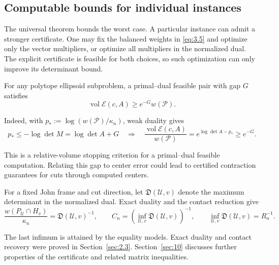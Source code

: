 \subsection{Computable bounds for individual instances}\label{sec:7.3}

The universal theorem bounds the worst case. A particular instance can admit a stronger certificate. One may fix the balanced weights in \eqref{eq:3.5} and optimize only the vector multipliers, or optimize all multipliers in the normalized dual. The explicit certificate is feasible for both choices, so such optimization can only improve its determinant bound.

For any polytope ellipsoid subproblem, a primal--dual feasible pair with gap $G$ satisfies
\begin{equation}\label{eq:7.9}
\operatorname{vol}\mathcal E(c,A)\ge e^{-G}w(\mathcal P).
\end{equation}

Indeed, with $p_*:=\log(w(\mathcal P)/\kappa_n)$, weak duality gives
\begin{equation}\label{eq:7.10}
p_*\le-\log\det M=\log\det A+G
\quad\Longrightarrow\quad
\frac{\operatorname{vol}\mathcal E(c,A)}{w(\mathcal P)}
=e^{\log\det A-p_*}\ge e^{-G}.
\end{equation}

This is a relative-volume stopping criterion for a primal--dual feasible computation. Relating this gap to center error could lead to certified contraction guarantees for cuts through computed centers.

For a fixed John frame and cut direction, let $\mathfrak D(\mathcal U,v)$ denote the maximum determinant in the normalized dual. Exact duality and the contact reduction give
\begin{equation}\label{eq:7.11}
\frac{w(P_{\mathcal U}\cap H_v)}{\kappa_n}
=\mathfrak D(\mathcal U,v)^{-1},\qquad
C_n=\left(\inf_{\mathcal U,v}\mathfrak D(\mathcal U,v)\right)^{-1},
\qquad \inf_{\mathcal U,v}\mathfrak D(\mathcal U,v)=R_n^{-1}.
\end{equation}

The last infimum is attained by the equality models. Exact duality and
contact recovery were proved in Section~\ref{sec:2.3}. Section~\ref{sec:10} discusses further
properties of the certificate and related matrix inequalities.
